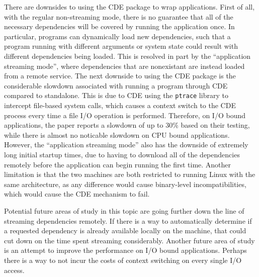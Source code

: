 \documentclass[11pt]{article}
\newcommand{\cde}{\textsc{CDE}\xspace}
\begin{document}
There are downsides to using the \cde package to wrap applications. First of all, with the regular non-streaming mode, there is no guarantee that all of the necessary dependencies will be covered by running the application once. In particular, programs can dynamically load new dependencies, such that a program running with different arguments or system state could result with different dependencies being loaded. This is resolved in part by the ``application streaming mode'', where dependencies that are nonexistant are instead loaded from a remote service. The next downside to using the \cde package is the considerable slowdown associated with running a program through \cde compared to standalone. This is due to \cde using the \texttt{ptrace} library to intercept file-based system calls, which causes a context switch to the \cde process every time a file I/O operation is performed. Therefore, on I/O bound applications, the paper reports a slowdown of up to 30\% based on their testing, while there is almost no noticable slowdown on CPU bound applications. However, the ``application streaming mode'' also has the downside of extremely long initial startup times, due to having to download all of the dependencies remotely before the application can begin running the first time. Another limitation is that the two machines are both restricted to running Linux with the same architecture, as any difference would cause binary-level incompatibilities, which would cause the \cde mechanism to fail.

Potential future areas of study in this topic are going further down the line of streaming dependencies remotely. If there is a way to automatically determine if a requested dependency is already available locally on the machine, that could cut down on the time spent streaming considerably.
Another future area of study is an attempt to improve the performance on I/O bound applications. Perhaps there is a way to not incur the costs of context switching on every single I/O access.



\end{document}
